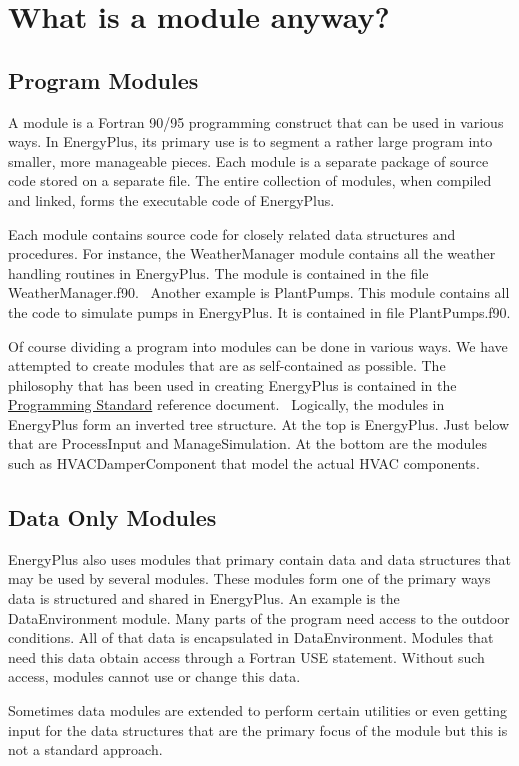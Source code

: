 \section{What is a module anyway?}\label{what-is-a-module-anyway}

\subsection{Program Modules}\label{program-modules}

A module is a Fortran 90/95 programming construct that can be used in various ways. In EnergyPlus, its primary use is to segment a rather large program into smaller, more manageable pieces. Each module is a separate package of source code stored on a separate file. The entire collection of modules, when compiled and linked, forms the executable code of EnergyPlus.

Each module contains source code for closely related data structures and procedures. For instance, the WeatherManager module contains all the weather handling routines in EnergyPlus. The module is contained in the file WeatherManager.f90.~ Another example is PlantPumps. This module contains all the code to simulate pumps in EnergyPlus. It is contained in file PlantPumps.f90.

Of course dividing a program into modules can be done in various ways. We have attempted to create modules that are as self-contained as possible. The philosophy that has been used in creating EnergyPlus is contained in the \href{file:///E:/Docs4PDFs/ProgrammingStandards.pdf}{Programming Standard} reference document.~ Logically, the modules in EnergyPlus form an inverted tree structure. At the top is EnergyPlus. Just below that are ProcessInput and ManageSimulation. At the bottom are the modules such as HVACDamperComponent that model the actual HVAC components.

\subsection{Data Only Modules}\label{data-only-modules}

EnergyPlus also uses modules that primary contain data and data structures that may be used by several modules. These modules form one of the primary ways data is structured and shared in EnergyPlus. An example is the DataEnvironment module. Many parts of the program need access to the outdoor conditions. All of that data is encapsulated in DataEnvironment. Modules that need this data obtain access through a Fortran USE statement. Without such access, modules cannot use or change this data.

Sometimes data modules are extended to perform certain utilities or even getting input for the data structures that are the primary focus of the module but this is not a standard approach.
